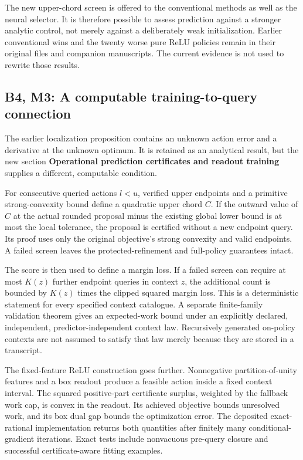 The new upper-chord screen is offered to the conventional methods as
well as the neural selector. It is therefore possible to assess
prediction against a stronger analytic control, not merely against a
deliberately weak initialization. Earlier conventional wins and the
twenty worse pure ReLU policies remain in their original files and
companion manuscripts. The current evidence is not used to rewrite those
results.

\hypertarget{b4-m3-a-computable-training-to-query-connection}{%
\subsection{B4, M3: A computable training-to-query
connection}\label{b4-m3-a-computable-training-to-query-connection}}

The earlier localization proposition contains an unknown action error
and a derivative at the unknown optimum. It is retained as an analytical
result, but the new section \textbf{Operational prediction certificates
and readout training} supplies a different, computable condition.

For consecutive queried actions \(l<u\), verified upper endpoints and a
primitive strong-convexity bound define a quadratic upper chord \(C\).
If the outward value of \(C\) at the actual rounded proposal minus the
existing global lower bound is at most the local tolerance, the proposal
is certified without a new endpoint query. Its proof uses only the
original objective's strong convexity and valid endpoints. A failed
screen leaves the protected-refinement and full-policy guarantees
intact.

The score is then used to define a margin loss. If a failed screen can
require at most \(K(z)\) further endpoint queries in context \(z\), the
additional count is bounded by \(K(z)\) times the clipped squared margin
loss. This is a deterministic statement for every specified context
catalogue. A separate finite-family validation theorem gives an
expected-work bound under an explicitly declared, independent,
predictor-independent context law. Recursively generated on-policy
contexts are not assumed to satisfy that law merely because they are
stored in a transcript.

The fixed-feature ReLU construction goes further. Nonnegative
partition-of-unity features and a box readout produce a feasible action
inside a fixed context interval. The squared positive-part certificate
surplus, weighted by the fallback work cap, is convex in the readout.
Its achieved objective bounds unresolved work, and its box dual gap
bounds the optimization error. The deposited exact-rational
implementation returns both quantities after finitely many
conditional-gradient iterations. Exact tests include nonvacuous
pre-query closure and successful certificate-aware fitting examples.

